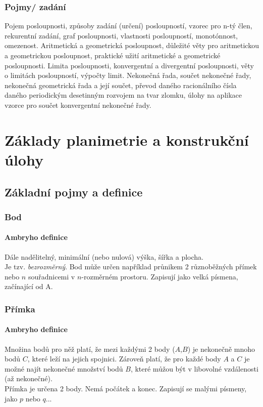 \documentclass[12pt]{article}
\begin{document}
\subsubsection{Pojmy/ zadání}
Pojem posloupnosti, způsoby zadání (určení) posloupností, vzorec pro n-tý člen, rekurentní zadání, graf posloupnosti, vlastnosti posloupností, monotónnost, omezenost. Aritmetická a geometrická posloupnost, důležité věty pro aritmetickou a geometrickou posloupnost, praktické užití aritmetické a geometrické posloupnosti. Limita posloupnosti, konvergentní a divergentní posloupnosti, věty o limitách posloupností, výpočty limit. Nekonečná řada, součet nekonečné řady, nekonečná geometrická řada a její součet, převod daného racionálního čísla daného periodickým desetinným rozvojem na tvar zlomku, úlohy na aplikace vzorce pro součet konvergentní nekonečné řady.

\section{Základy planimetrie a konstrukční úlohy}
\subsection{Základní pojmy a definice}
\subsubsection{Bod}
\paragraph{Ambryho definice} Dále nadělitelný, minimální (nebo nulová) výška, šířka a plocha.\\
Je tzv. \emph{bezrozměrný}. Bod může určen například průnikem 2 různoběžných přímek nebo $n$ souřadnicemi v $n$-rozměrném prostoru. Zapisují jako velká písmena, začínající od A.
\subsubsection{Přímka}
\paragraph{Ambryho definice} Množina bodů pro něž platí, že mezi každými 2 body ($A$,$B$) je nekonečně mnoho bodů $C$, které leží na jejich spojnici. Zároveň platí, že pro každé body $A$ a $C$ je možné najít nekonečné množství bodů $B$, které můžou být v libovolné vzdálenosti (až nekonečné).\\
Přímka je určena 2 body. Nemá počátek a konec. Zapisují se malými písmeny, jako $p$ nebo $q$...
\end{document}
